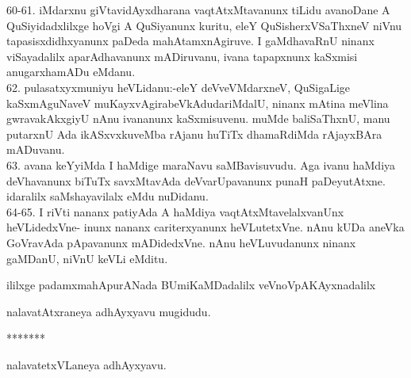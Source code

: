 \documentclass{article}
\begin{document}
60-61. iMdarxnu giVtavidAyxdharana vaqtAtxMtavanunx tiLidu avanoDane A QuSiyidadxlilxge hoVgi A QuSiyanunx kuritu, eleY QuSisherxVSaThxneV niVnu tapasisxdidhxyanunx paDeda mahAtamxnAgiruve. I gaMdhavaRnU ninanx viSayadalilx aparAdhavanunx mADiruvanu, ivana tapapxnunx kaSxmisi anugarxhamADu eMdanu.\\
62. pulasatxyxmuniyu heVLidanu:-eleY deVveVMdarxneV, QuSigaLige kaSxmAguNaveV muKayxvAgirabeVkAdudariMdalU, ninanx mAtina meVlina gwravakAkxgiyU nAnu ivananunx kaSxmisuvenu. muMde baliSaThxnU, manu putarxnU Ada ikASxvxkuveMba rAjanu huTiTx dhamaRdiMda rAjayxBAra mADuvanu.\\
63. avana keYyiMda I haMdige maraNavu saMBavisuvudu. Aga ivanu haMdiya deVhavanunx biTuTx savxMtavAda deVvarUpavanunx punaH paDeyutAtxne. idaralilx saMshayavilalx eMdu nuDidanu.\\
64-65. I riVti nananx patiyAda A haMdiya vaqtAtxMtavelalxvanUnx heVLidedxVne- inunx nananx cariterxyanunx heVLutetxVne. nAnu kUDa aneVka GoVravAda pApavanunx mADidedxVne. nAnu heVLuvudanunx ninanx gaMDanU, niVnU keVLi eMditu.\\

\begin{center}
ililxge padamxmahApurANada BUmiKaMDadalilx veVnoVpAKAyxnadalilx
\end{center}

\begin{center}
nalavatAtxraneya adhAyxyavu mugidudu.
\end{center}

\begin{center}
*******
\end{center}

\begin{center}
nalavatetxVLaneya adhAyxyavu.
\end{center}
\end{document}
